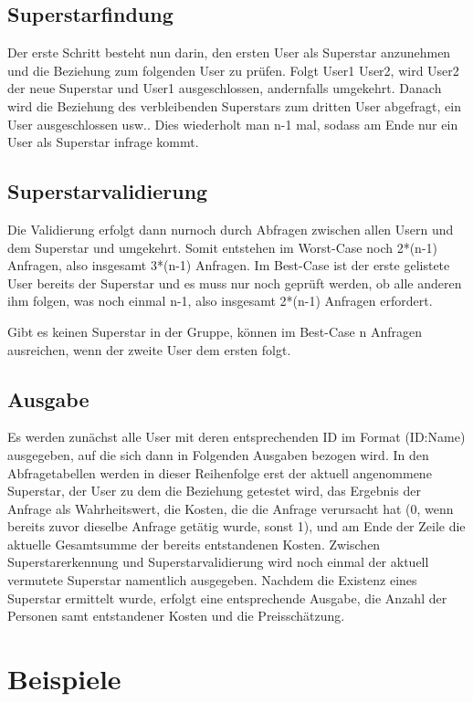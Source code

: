 \documentclass[a4paper,10pt,ngerman]{scrartcl}
\begin{document}
\subsection{Superstarfindung}
Der erste Schritt besteht nun darin, den ersten User als Superstar anzunehmen und die Beziehung zum folgenden User zu prüfen. Folgt User1 User2, wird User2 der neue Superstar und User1 ausgeschlossen, andernfalls umgekehrt. Danach wird die Beziehung des verbleibenden Superstars zum dritten User abgefragt, ein User ausgeschlossen usw.. Dies wiederholt man n-1 mal, sodass am Ende nur ein User als Superstar infrage kommt.

\subsection{Superstarvalidierung}
Die Validierung erfolgt dann nurnoch durch Abfragen zwischen allen Usern und dem Superstar und umgekehrt. Somit entstehen im Worst-Case noch 2*(n-1) Anfragen, also insgesamt 3*(n-1) Anfragen. Im Best-Case ist der erste gelistete User bereits der Superstar und es muss nur noch geprüft werden, ob alle anderen ihm folgen, was noch einmal n-1, also insgesamt 2*(n-1) Anfragen erfordert.

Gibt es keinen Superstar in der Gruppe, können im Best-Case n Anfragen ausreichen, wenn der zweite User dem ersten folgt.

\subsection{Ausgabe}
Es werden zunächst alle User mit deren entsprechenden ID im Format (ID:Name) ausgegeben, auf die sich dann in Folgenden Ausgaben bezogen wird. In den Abfragetabellen werden in dieser Reihenfolge erst der aktuell angenommene Superstar, der User zu dem die Beziehung getestet wird, das Ergebnis der Anfrage als Wahrheitswert, die Kosten, die die Anfrage verursacht hat (0, wenn bereits zuvor dieselbe Anfrage getätig wurde, sonst 1), und am Ende der Zeile die aktuelle Gesamtsumme der bereits entstandenen Kosten.
Zwischen Superstarerkennung und Superstarvalidierung wird noch einmal der aktuell vermutete Superstar namentlich ausgegeben.
Nachdem die Existenz eines Superstar ermittelt wurde, erfolgt eine entsprechende Ausgabe, die Anzahl der Personen samt entstandener Kosten und die Preisschätzung.

\pagebreak
\section{Beispiele}
\end{document}
